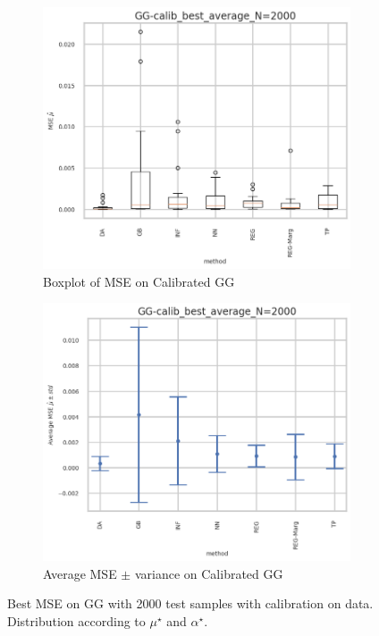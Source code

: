 \begin{figure}[ht!]
  \begin{subfigure}[t]{0.49\linewidth}
    \includegraphics[width=\linewidth]{COMPARE/GG-calib/BEST_MSE/GG-calib_best_average_N=2000-boxplot_mse.png}
    \caption{Boxplot of MSE on Calibrated GG}
  \end{subfigure}%
  \hfill
  \begin{subfigure}[t]{0.49\linewidth}
    \includegraphics[width=\linewidth]{COMPARE/GG-calib/BEST_MSE/GG-calib_best_average_N=2000-errplot_mse.png}
    \caption{Average MSE $\pm$ variance on Calibrated GG}
  \end{subfigure}

  \caption{Best MSE on GG with 2000 test samples with calibration on data. Distribution according to $\mu^\star$ and $\alpha^\star$.}
  \label{fig:compare_gg_best_mse}
\end{figure}

